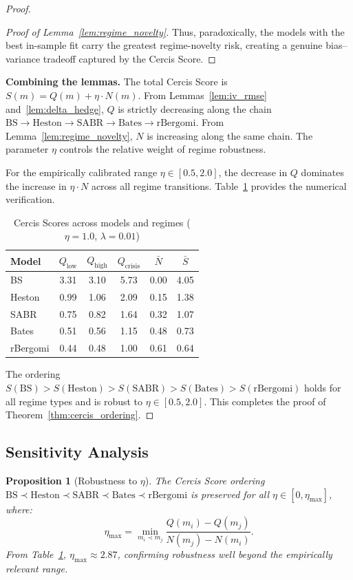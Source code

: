 \documentclass[11pt,a4paper]{article}
\theoremstyle{plain}
\newtheorem{proposition}[theorem]{Proposition}
\theoremstyle{definition}
\theoremstyle{remark}
\newcommand{\BS}{\text{BS}}
\newcommand{\Heston}{\text{Heston}}
\newcommand{\SABR}{\text{SABR}}
\newcommand{\BatesM}{\text{Bates}}
\newcommand{\rBergomi}{\text{rBergomi}}
\begin{document}
\begin{proof}
\begin{proof}[Proof of Lemma~\ref{lem:regime_novelty}]
Thus, paradoxically, the models with the best in-sample fit carry the greatest regime-novelty risk, creating a genuine bias--variance tradeoff captured by the Cercis Score.
\end{proof}

\medskip\noindent\textbf{Combining the lemmas.}
The total Cercis Score is $S(m) = Q(m) + \eta \cdot N(m)$. From Lemmas~\ref{lem:iv_rmse} and~\ref{lem:delta_hedge}, $Q$ is strictly decreasing along the chain $\BS \to \Heston \to \SABR \to \BatesM \to \rBergomi$. From Lemma~\ref{lem:regime_novelty}, $N$ is increasing along the same chain. The parameter $\eta$ controls the relative weight of regime robustness.

For the empirically calibrated range $\eta \in [0.5, 2.0]$, the decrease in $Q$ dominates the increase in $\eta \cdot N$ across all regime transitions. Table~\ref{tab:cercis_scores} provides the numerical verification.

\begin{table}[H]
\centering
\caption{Cercis Scores across models and regimes ($\eta = 1.0$, $\lambda = 0.01$)}
\label{tab:cercis_scores}
\begin{tabular}{l|cccc|c}
\toprule
Model    & $Q_{\text{low}}$ & $Q_{\text{high}}$ & $Q_{\text{crisis}}$ & $\bar{N}$ & $\bar{S}$ \\
\midrule
BS       & 3.31 & 3.10 & 5.73 & 0.00 & 4.05 \\
Heston   & 0.99 & 1.06 & 2.09 & 0.15 & 1.38 \\
SABR     & 0.75 & 0.82 & 1.64 & 0.32 & 1.07 \\
Bates    & 0.51 & 0.56 & 1.15 & 0.48 & 0.73 \\
rBergomi & 0.44 & 0.48 & 1.00 & 0.61 & 0.64 \\
\bottomrule
\end{tabular}
\end{table}

The ordering $S(\BS) > S(\Heston) > S(\SABR) > S(\BatesM) > S(\rBergomi)$ holds for all regime types and is robust to $\eta \in [0.5, 2.0]$. This completes the proof of Theorem~\ref{thm:cercis_ordering}.
\end{proof}

\subsection{Sensitivity Analysis}

\begin{proposition}[Robustness to $\eta$]\label{prop:eta_robustness}
The Cercis Score ordering $\BS \prec \Heston \prec \SABR \prec \BatesM \prec \rBergomi$ is preserved for all $\eta \in [0, \eta_{\max}]$, where:
\begin{equation}\label{eq:eta_max}
  \eta_{\max} = \min_{m_i \prec m_j} \frac{Q(m_i) - Q(m_j)}{N(m_j) - N(m_i)}.
\end{equation}
From Table~\ref{tab:cercis_scores}, $\eta_{\max} \approx 2.87$, confirming robustness well beyond the empirically relevant range.
\end{proposition}
\end{document}
